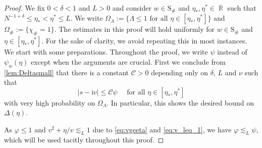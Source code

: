 \documentclass[11pt]{article}
\DeclareMathOperator{\RR}{\mathbb{R}}
\newcommand{\ii}{\mathrm{i}}
\newcommand{\abs}[1]{\left| #1 \right|}
\theoremstyle{plain}
\theoremstyle{remark}
\numberwithin{equation}{section}
\begin{document}
	\begin{proof}
		We fix $0 <\delta <1$ and $ L >0$ and consider $w \in \mathrm{S}_\#$ and $\eta_{\ast},\eta^\ast \in \RR$ such that $ N^{-1+\delta} \le \eta_{\ast} < \eta^{\ast} \le L$. We write $ \Omega_\Lambda :=\{ \Lambda \leq 1 \text{ for all } \eta \in [ \eta_{\ast}, \eta^{\ast}]\}$ and $\Omega_{\#} := \{ \chi_\#=1\}$. 	The estimates in this proof will hold uniformly for $w \in \mathrm{S}_\#$ and $\eta \in [\eta_*,\eta^*]$. For the sake of clarity, we avoid repeating this in most instances.
		We start with some preparations. 
		Throughout the proof, we write $\psi$ instead of $\psi_w(\eta)$ except when the arguments are crucial.  
		First we conclude from \cref{lem:Deltasmall} that there is a constant $\mathcal C>0$ depending only on $\delta$, $L$ and $\nu$ such that 
		\begin{equation} \label{eq:proof_bootstrapp_edge_aux2} 
			\abs{s - \ii v} \leq \mathcal C \psi \quad \text{ for all } \eta \in [\eta_\ast, \eta^\ast]
		\end{equation} 
		with very high probability on $\Omega_\Lambda$. In particular, this shows the desired bound on $\Delta(\eta)$. 
		
		As $\varphi   \le 1$ and $v^2 + \eta/v \lesssim_L 1$ due to \eqref{eq:vgeeta} and \eqref{eq:v_leq_1}, we have $\varphi \lesssim_L\psi$, which will be used tacitly throughout this proof. 
		

\end{proof}
\end{document}
